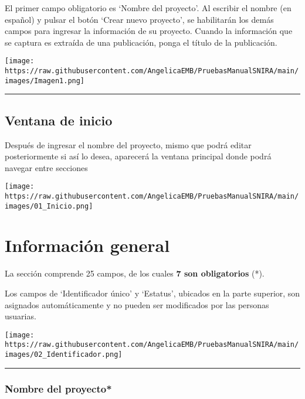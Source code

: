 \documentclass[
]{book}
\begin{document}
El primer campo obligatorio es `Nombre del proyecto'. Al escribir el nombre (en español) y pulsar el botón `Crear nuevo proyecto', se habilitarán los demás campos para ingresar la información de su proyecto. Cuando la información que se captura es extraída de una publicación, ponga el título de la publicación.

\texttt{[image: https://raw.githubusercontent.com/AngelicaEMB/PruebasManualSNIRA/main/images/Imagen1.png]}

\begin{center}\rule{0.5\linewidth}{0.5pt}\end{center}

\hypertarget{ventana-de-inicio}{%
\section*{Ventana de inicio}\label{ventana-de-inicio}}

Después de ingresar el nombre del proyecto, mismo que podrá editar posteriormente si así lo desea, aparecerá la ventana principal donde podrá navegar entre secciones

\texttt{[image: https://raw.githubusercontent.com/AngelicaEMB/PruebasManualSNIRA/main/images/01\_Inicio.png]}

\hypertarget{informaciuxf3n-general}{%
\chapter{Información general}\label{informaciuxf3n-general}}

La sección comprende 25 campos, de los cuales \textbf{7 son obligatorios} ({*}).

Los campos de `Identificador único' y `Estatus', ubicados en la parte superior, son asignados automáticamente y no pueden ser modificados por las personas usuarias.

\texttt{[image: https://raw.githubusercontent.com/AngelicaEMB/PruebasManualSNIRA/main/images/02\_Identificador.png]}

\begin{center}\rule{0.5\linewidth}{0.5pt}\end{center}

\hypertarget{nombre-del-proyecto}{%
\subsection*{\texorpdfstring{{Nombre del proyecto*}}{Nombre del proyecto*}}\label{nombre-del-proyecto}}
\end{document}
